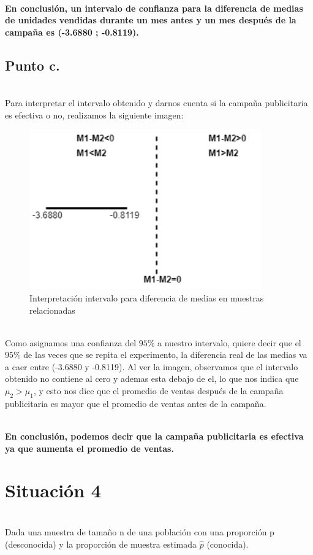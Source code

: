\documentclass[letterpaper,12pt,onecolumn,titlepage]{article}
\begin{document}
~\\ \textbf{En conclusi\'{o}n, un intervalo de confianza para la diferencia de medias de unidades vendidas durante un mes antes y un mes despu\'{e}s de la campa\~{n}a es (-3.6880 ; -0.8119).}

\pagebreak
\subsection{Punto c.}
~\\ Para interpretar el intervalo obtenido y darnos cuenta si la campa\~{n}a publicitaria es efectiva o no, realizamos la siguiente imagen:
\begin{figure}[!h]
    \begin{center}
        \includegraphics[width=10cm]{Figuras/Grafico3.png}
        \caption{Interpretaci\'{o}n intervalo para diferencia de medias en muestras relacionadas}
        \label{fig:Densidad}
    \end{center}
\end{figure}

~\\ Como asignamos una confianza del $95\%$ a nuestro intervalo, quiere decir que el $95\%$ de las veces que se repita el experimento, la diferencia real de las medias va a caer entre (-3.6880 y -0.8119). Al ver la imagen, observamos que el intervalo obtenido no contiene al cero y ademas esta debajo de el, lo que nos indica que $\mu_2>\mu_1$, y esto nos dice que el promedio de ventas despu\'{e}s de la campa\~{n}a publicitaria es mayor que el promedio de ventas antes de la campa\~{n}a. 

~\\ \textbf{En conclusi\'{o}n, podemos decir que la campa\~{n}a publicitaria es efectiva ya que aumenta el promedio de ventas.}

\pagebreak\section{Situaci\'{o}n 4}
~\\ Dada una muestra de tama\~{n}o n de una poblaci\'{o}n con una proporci\'{o}n p (desconocida) y
la proporci\'{o}n de muestra estimada  $\hat{p}$ (conocida).
\end{document}
